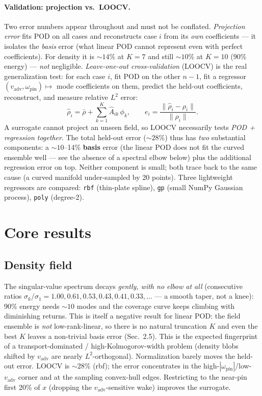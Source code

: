 \documentclass[11pt]{article}
\newcommand{\vadv}{v_{\mathrm{adv}}}
\newcommand{\opin}{\omega_{\mathrm{pin}}}
\begin{document}
\paragraph{Validation: projection vs.\ LOOCV.}
Two error numbers appear throughout and must not be conflated.
\emph{Projection error} fits POD on all cases and reconstructs case $i$
from its \emph{own} coefficients --- it isolates the \emph{basis} error
(what linear POD cannot represent even with perfect coefficients). For
density it is ${\sim}14\%$ at $K{=}7$ and still ${\sim}10\%$ at $K{=}10$
(90\% energy) --- \emph{not} negligible. \emph{Leave-one-out
cross-validation} (LOOCV) is the real generalization test: for each case
$i$, fit POD on the other $n{-}1$, fit a regressor
$(\vadv,\opin)\mapsto$ mode coefficients on them, predict the held-out
coefficients, reconstruct, and measure relative $L^2$ error:
\[
\hat\rho_i=\bar\rho+\sum_{k=1}^{K}\hat A_{ik}\,\phi_k,\qquad
e_i=\frac{\lVert\hat\rho_i-\rho_i\rVert}{\lVert\rho_i\rVert}.
\]
A surrogate cannot project an unseen field, so LOOCV necessarily tests
\emph{POD + regression together}. The total held-out error
(${\sim}28\%$) thus has \emph{two} substantial components: a
${\sim}10$--14\% \textbf{basis} error (the linear POD does not fit the
curved ensemble well --- see the absence of a spectral elbow below) plus
the additional regression error on top. Neither component is small; both
trace back to the same cause (a curved manifold under-sampled by 20
points). Three lightweight regressors are compared: \texttt{rbf}
(thin-plate spline), \texttt{gp} (small NumPy Gaussian process),
\texttt{poly} (degree-2).

\section{Core results}\label{sec:results}

\subsection{Density field}
The singular-value spectrum decays \emph{gently, with no elbow at all}
(consecutive ratios $\sigma_k/\sigma_1 = 1.00, 0.61, 0.53, 0.43, 0.41,
0.33,\ldots$ --- a smooth taper, not a knee): 90\% energy needs ${\sim}10$
modes and the coverage curve keeps climbing with diminishing returns. This
is itself a negative result for linear POD: the field ensemble is
\emph{not} low-rank-linear, so there is no natural truncation $K$ and even
the best $K$ leaves a non-trivial basis error (Sec.~2.5). This is the
expected fingerprint of a transport-dominated / high-Kolmogorov-width
problem (density blobs shifted by $\vadv$ are nearly $L^2$-orthogonal).
Normalization barely moves the held-out error. LOOCV is ${\sim}28\%$
(rbf); the error concentrates in the high-$|\opin|$/low-$\vadv$ corner and
at the sampling convex-hull edges. Restricting to the near-pin first 20\%
of $x$ (dropping the $\vadv$-sensitive wake) improves the surrogate.
\end{document}
